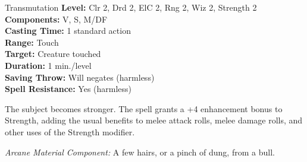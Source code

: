 {Transmutation}
{
	\textbf{Level:}
	Clr 2, Drd 2, ElC 2, Rng 2, Wiz 2, Strength 2\\
	\textbf{Components:}
	V, S, M/DF\\
	\textbf{Casting Time:}
	1 standard action\\
	\textbf{Range:}
	Touch\\
	\textbf{Target:}
	Creature touched\\
	\textbf{Duration:}
	1 min./level\\
	\textbf{Saving Throw:}
	Will negates (harmless)\\
	\textbf{Spell Resistance:}
	Yes (harmless)\\
}
{
	The subject becomes stronger. The spell grants a +4 enhancement bonus to Strength, adding the usual benefits to melee attack rolls, melee damage rolls, and other uses of the Strength modifier.

	\textit{Arcane Material Component:}
	A few hairs, or a pinch of dung, from a bull.

}

